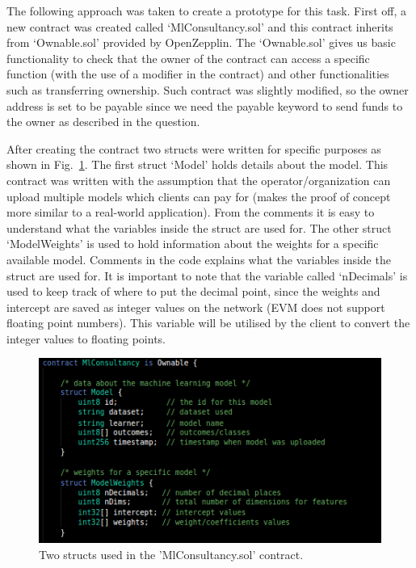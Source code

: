 \noindent
The following approach was taken to create a prototype for this task. First off, a new contract was created called ‘MlConsultancy.sol’ and this contract inherits from ‘Ownable.sol’ provided by OpenZepplin. The ‘Ownable.sol’ gives us basic functionality to check that the owner of the contract can access a specific function (with the use of a modifier in the contract) and other functionalities such as transferring ownership. Such contract was slightly modified, so the owner address is set to be payable since we need the payable keyword to send funds to the owner as described in the question.

\noindent
After creating the contract two structs were written for specific purposes as shown in Fig.~\ref{fig:model_sol_1}. The first struct ‘Model’ holds details about the model. This contract was written with the assumption that the operator/organization can upload multiple models which clients can pay for (makes the proof of concept more similar to a real-world application). From the comments it is easy to understand what the variables inside the struct are used for. The other struct ‘ModelWeights’ is used to hold information about the weights for a specific available model. Comments in the code explains what the variables inside the struct are used for. It is important to note that the variable called ‘nDecimals’ is used to keep track of where to put the decimal point, since the weights and intercept are saved as integer values on the network (EVM does not support floating point numbers). This variable will be utilised by the client to convert the integer values to floating points. 

\begin{figure}[H]
\centering
  \includegraphics[scale = .75]{imgs/model_sol_1.png}
  \caption{Two structs used in the 'MlConsultancy.sol' contract.}
  \label{fig:model_sol_1}
\end{figure}


